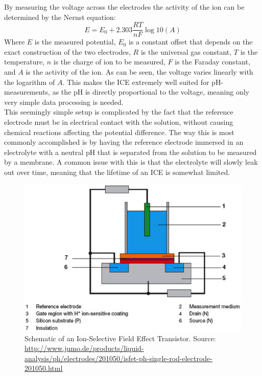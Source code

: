 \noindent
By measuring the voltage across the electrodes the activity of the ion can be determined by the Nernst equation\cite{website:ph1}:
\begin{equation}\label{key}
E = E_0 + 2.303 \frac{R T}{n F} \log10{(A)}
\end{equation}
Where $E$ is the measured potential, $E_0$ is a constant offset that depends on the exact construction of the two electrodes, $R$ is the universal gas constant, $T$ is the temperature, $n$ is the charge of ion to be measured, $F$ is the Faraday constant, and $A$ is the activity of the ion\cite{website:ph1}. As can be seen, the voltage varies linearly with the logarithm of $A$. This makes the ICE extremely well suited for pH-measurements, as the pH is directly proportional to the voltage, meaning only very simple data processing is needed.\\


\noindent
This seemingly simple setup is complicated by the fact that the reference electrode must be in electrical contact with the solution, without causing chemical reactions affecting the potential difference. The way this is most commonly accomplished is by having the reference electrode immersed in an electrolyte with a neutral pH that is separated from the solution to be measured by a membrane\cite{website:ph2}. A common issue with this is that the electrolyte will slowly leak out over time, meaning that the lifetime of an ICE is somewhat limited. \\

\begin{figure}[htb]
	\centering
	\includegraphics[width=.7\textwidth]{figures/ISFET.png}
	\caption{Schematic of an Ion-Selective Field Effect Transistor. Source: \url{http://www.jumo.de/products/liquid-analysis/ph/electrodes/201050/isfet-ph-single-rod-electrode-201050.html}}
	\label{fig:ISFET}
\end{figure}

